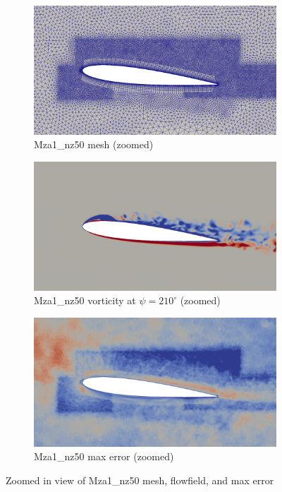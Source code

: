 \begin{figure}[H]
	\centering
\begin{subfigure}[b]{0.7\textwidth}
	\centering
	\includegraphics[width=1\textwidth]{figures/adapt_strat/zoomed/Mza1_mesh.png}
	\caption{Mza1\_nz50 mesh (zoomed)}
	\label{fig:Mza1_mesh_zoomed}
\end{subfigure}
\begin{subfigure}[b]{0.7\textwidth}
	\centering
	\includegraphics[width=1\textwidth]{figures/adapt_strat/zoomed/Mza1_ph_210.png}
	\caption{Mza1\_nz50 vorticity at $\psi=210^\circ$ (zoomed)}
	\label{fig:Mza1_vorticity_zoomed}
\end{subfigure}
\begin{subfigure}[b]{0.7\textwidth}
	\centering
	\includegraphics[width=1\textwidth]{figures/adapt_strat/zoomed/Mza1_error.png}
	\caption{Mza1\_nz50 max error (zoomed)}
	\label{fig:Mza1_max_error_zoomed}
\end{subfigure}
\caption{Zoomed in view of Mza1\_nz50 mesh, flowfield, and max error}
\label{fig:Mza1_zoomed}
\end{figure}

